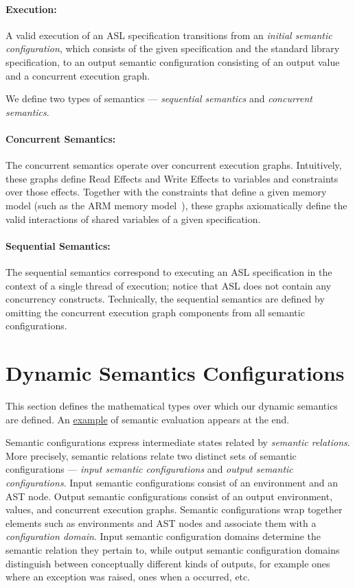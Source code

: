 \paragraph{Execution:}
A valid execution of an ASL specification transitions from an \emph{initial semantic configuration},
which consists of the given specification and the standard library specification, to an output semantic configuration
consisting of an output value and a concurrent execution graph.

We define two types of semantics --- \emph{sequential semantics} and \emph{concurrent semantics}.

\paragraph{Concurrent Semantics:}
The concurrent semantics operate over concurrent execution graphs.
Intuitively, these graphs define Read Effects and Write Effects to variables and constraints over those effects.
Together with the constraints that define a given memory model (such as the ARM memory model~\cite{AlglaveDGHM21}),
these graphs axiomatically define
the valid interactions of shared variables of a given specification.

\paragraph{Sequential Semantics:}
The sequential semantics correspond to executing an ASL specification in the context of a single thread
of execution; notice that ASL does not contain any concurrency constructs.
%
Technically, the sequential semantics are defined by omitting the concurrent execution graph components
from all semantic configurations.

\section{Dynamic Semantics Configurations\label{sec:Dynamic Semantics Configurations}}
This section defines the mathematical types over which our dynamic semantics are defined.
An \hyperlink{eval-example}{example} of semantic evaluation appears at the end.

Semantic configurations express intermediate states related by \emph{semantic relations}.
%
More precisely, semantic relations relate two distinct sets of semantic configurations ---
\emph{input semantic configurations} and \emph{output semantic configurations}.
Input semantic configurations consist of an environment and an AST node.
Output semantic configurations consist of an output environment, values,
and concurrent execution graphs.
%
Semantic configurations wrap together elements such as environments and AST nodes
and associate them with a \emph{configuration domain}. Input semantic configuration domains
determine the semantic relation they pertain to, while output semantic configuration
domains distinguish between conceptually different kinds of outputs, for example
ones where an exception was raised, ones when a \dynamicerrorterm{} occurred, etc.

